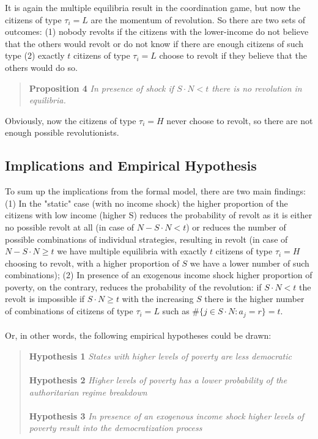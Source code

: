 \documentclass[a4paper, 12pt]{article}
\begin{document}
    \noindent It is again the multiple equilibria result in the coordination game, but now the citizens of type $\tau_i = L$ are the momentum of revolution. So there are two sets of outcomes: (1) nobody revolts if the citizens with the lower-income do not believe that the others would revolt or do not know if there are enough citizens of such type (2) exactly $t$ citizens of type $\tau_i = L$ choose to revolt if they believe that the others would do so.
    
    \begin{quote}
        \textbf{Proposition 4} \textit{In presence of shock if $S\cdot N < t$ there is no revolution in equilibria.}
    \end{quote}
    
    \noindent Obviously, now the citizens of type $\tau_i=H$ never choose to revolt, so there are not enough possible revolutionists.
    
    \subsection{Implications and Empirical Hypothesis}
	
	To sum up the implications from the formal model, there are two main findings: (1) In the "static" case (with no income shock) the higher proportion of the citizens with low income (higher S) reduces the probability of revolt as it is either no possible revolt at all (in case of $N - S\cdot N < t$) or reduces the number of possible combinations of individual strategies, resulting in revolt (in case of $N - S \cdot N \geq t$ we have multiple equilibria with exactly $t$ citizens of type $\tau_i=H$ choosing to revolt, with a higher proportion of $S$ we have a lower number of such combinations); (2) In presence of an exogenous income shock higher proportion of poverty, on the contrary, reduces the probability of the revolution: if $S\cdot N < t$ the revolt is impossible if $S\cdot N \geq t$ with the increasing $S$ there is the higher number of combinations of citizens of type $\tau_i=L$ such as $\# \{j \in S \cdot N: a_j = r\} = t$.
	\\\\
	\noindent Or, in other words, the following empirical hypotheses could be drawn:
	\begin{quote}
	    \textbf{Hypothesis 1} \textit{States with higher levels of poverty are less democratic}
	    \\\\
	    \textbf{Hypothesis 2} \textit{Higher levels of poverty has a lower probability of the authoritarian regime breakdown}
	    \\\\
	    \textbf{Hypothesis 3} \textit{In presence of an exogenous income shock higher levels of poverty result into the democratization process}
	\end{quote}
	
\end{document}
